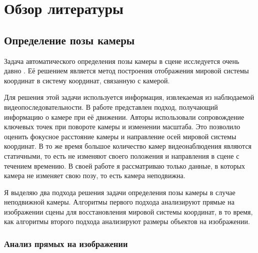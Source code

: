 \chapter{Обзор литературы}  \label{chapt1}

\section{Определение позы камеры}

Задача автоматического определения позы камеры в сцене исследуется очень давно \cite{caprile1990using,li2010simultaneous,liu2011surveillance,chen2007accurate,pflugfelder2007people,den2015automatic,puwein2012ptz,dubska2014automatic}. Её решением является метод построения отображения мировой системы координат в систему координат, связанную с камерой.

Для решения этой задачи используется информация, извлекаемая из наблюдаемой видеопоследовательности. В работе \cite{puwein2012ptz} представлен подход, получающий информацию о камере при её движении. Авторы использовали сопровождение ключевых точек при повороте камеры и изменении масштаба. Это позволило оценить фокусное расстояние камеры и направление осей мировой системы координат. В то же время большое количество камер видеонаблюдения являются статичными, то есть не изменяют своего положения и направления в сцене с течением времению. В своей работе я рассматриваю только данные, в которых камера не изменяет свою позу, то есть камера неподвижна.

Я выделяю два подхода решения задачи определения позы камеры в случае неподвижной камеры. Алгоритмы первого подхода анализируют прямые на изображении сцены для восстановления мировой системы координат, в то время, как алгоритмы второго подхода анализируют размеры объектов на изображении.

\subsection{Анализ прямых на изображении}

